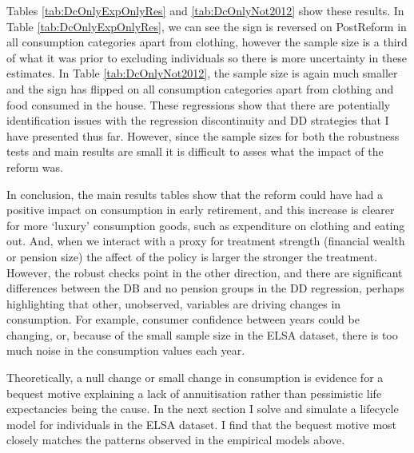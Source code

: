 \documentclass[12pt]{article}
\begin{document}
\begin{landscape}
    \linespread{1}
    
\end{landscape}

\begin{landscape}
    \linespread{1}
    
\end{landscape}

Tables \ref{tab:DcOnlyExpOnlyRes} and \ref{tab:DcOnlyNot2012} show these
results. In Table \ref{tab:DcOnlyExpOnlyRes}, we can see the sign is reversed on
PostReform in all consumption categories apart from clothing, however the sample
size is a third of what it was prior to excluding individuals so there is more
uncertainty in these estimates. In Table \ref{tab:DcOnlyNot2012}, the sample
size is again much smaller and the sign has flipped on all consumption
categories apart from clothing and food consumed in the house. These regressions
show that there are potentially identification issues with the regression
discontinuity and DD strategies that I have presented thus far. However, since
the sample sizes for both the robustness tests and main results are small it is
difficult to asses what the impact of the reform was.


In conclusion, the main results tables show that the reform could have had a
positive impact on consumption in early retirement, and this increase is clearer
for more `luxury' consumption goods, such as expenditure on clothing and eating
out. And, when we interact with a proxy for treatment strength (financial wealth
or pension size) the affect of the policy is larger the stronger the treatment.
However, the robust checks point in the other direction, and there are
significant differences between the DB and no pension groups in the DD
regression, perhaps highlighting that other, unobserved, variables are driving
changes in consumption. For example, consumer confidence between years could be
changing, or, because of the small sample size in the ELSA dataset, there is too
much noise in the consumption values each year.

Theoretically, a null change or small change in consumption is evidence for a
bequest motive explaining a lack of annuitisation rather than pessimistic life
expectancies being the cause. In the next section I solve and simulate a
lifecycle model for individuals in the ELSA dataset. I find that the bequest
motive most closely matches the patterns observed in the empirical models above.
\end{document}
